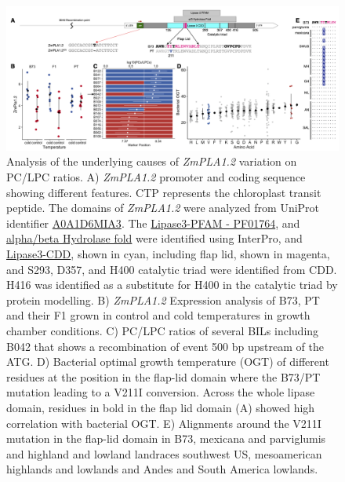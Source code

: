 \documentclass[9pt,twocolumn,twoside]{BioRxiv}
\begin{document}
\begin{figure}[ht]
\begin{center}
\includegraphics[width=0.8\paperwidth]{Figures/Fig_4.png}
\caption{Analysis of the underlying causes of \textit{ZmPLA1.2} variation on PC/LPC ratios.    
A) \textit{ZmPLA1.2} promoter and coding sequence showing different features. CTP represents the chloroplast transit peptide. The domains of \textit{ZmPLA1.2} were analyzed from UniProt identifier \hyperlink{https://www.uniprot.org/uniprot/A0A1D6MIA3}{A0A1D6MIA3}. The \hyperlink{https://www.ebi.ac.uk/interpro/entry/pfam/PF01764/}{Lipase3-PFAM - PF01764}, and \hyperlink{https://www.ebi.ac.uk/interpro/entry/InterPro/IPR029058/}{alpha/beta Hydrolase fold} were identified using InterPro, and \hyperlink{https://www.ncbi.nlm.nih.gov/Structure/cdd/cddsrv.cgi?uid=cd00519}{Lipase3-CDD}, shown in cyan, including flap lid, shown in magenta, and S293, D357, and H400 catalytic triad were identified from CDD. H416 was identified as a substitute for H400 in the catalytic triad by protein modelling.
B) \textit{ZmPLA1.2} Expression analysis of B73, PT and their F1 grown in control and cold temperatures in growth chamber conditions. 
C) PC/LPC ratios of several BILs including B042 that shows a recombination of event 500 bp upstream of the ATG.
D) Bacterial optimal growth temperature (OGT) of different residues at the position in the flap-lid domain where the B73/PT mutation leading to a V211I conversion. Across the whole lipase domain, residues in bold in the flap lid domain (A) showed high correlation with bacterial OGT. 
E) Alignments around the V211I mutation in the flap-lid domain in B73, mexicana and parviglumis and highland and lowland landraces southwest US, mesoamerican highlands and lowlands and Andes and South America lowlands.} 
\label{Fig4}
\end{center}
\end{figure} 
\end{document}
